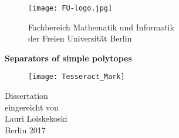\documentclass[a4paper,12pt]{book}
\theoremstyle{plain}
\theoremstyle{definition}
\begin{document}
\pagestyle{empty}

\begin{titlepage}
\setlength{\hoffset}{5mm}
\begin{center}
\begin{figure}[h]
\begin{minipage}{.35\textwidth}
\begin{center}
\texttt{[image: FU-logo.jpg]}
\end{center}
\end{minipage}
\begin{minipage}{.64\textwidth}
\large {Fachbereich Mathematik und Informatik\\
der Freien Universit\"at Berlin}
\end{minipage}
\end{figure}

\vspace{1.5cm}
\LARGE{\bf{
Separators of simple polytopes}}\\

\vspace{1cm}
\begin{figure}[h]
\begin{center}

\texttt{[image: Tesseract\_Mark]}

\end{center}
\end{figure}
\vspace{0.5cm}
\LARGE{
{Dissertation}\\}
\large
\vspace{1cm}
eingereicht von\\
Lauri Loiskekoski\\
\vspace{1.5cm}
Berlin 2017\\
\vspace{3cm}
\end{center}
\end{titlepage}

\cleardoublepage\thispagestyle{empty}
\end{document}
